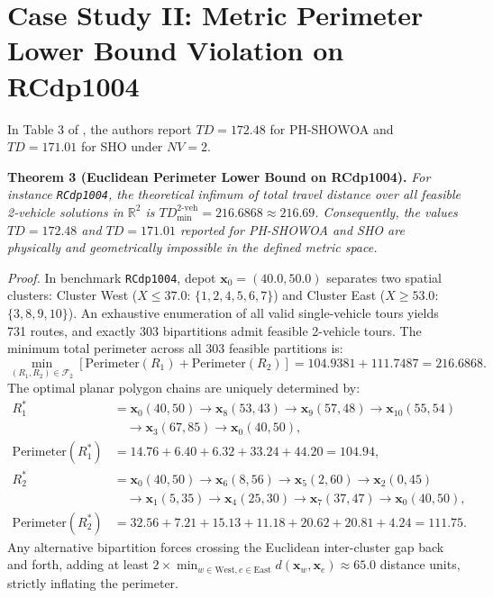 \documentclass[review]{elsarticle}
\begin{document}
\section{Case Study II: Metric Perimeter Lower Bound Violation on RCdp1004}
\label{sec:rcdp1004}
In Table 3 of \cite{nguyen2026phshowoa}, the authors report $TD = 172.48$ for PH-SHOWOA and $TD = 171.01$ for SHO under $NV = 2$.

\vspace{0.25cm}
\noindent\textbf{Theorem 3 (Euclidean Perimeter Lower Bound on RCdp1004).}
\textit{For instance \texttt{RCdp1004}, the theoretical infimum of total travel distance over all feasible 2-vehicle solutions in $\mathbb{R}^2$ is $TD_{\min}^{2\text{-veh}} = 216.6868 \approx 216.69$. Consequently, the values $TD = 172.48$ and $TD = 171.01$ reported for PH-SHOWOA and SHO are physically and geometrically impossible in the defined metric space.}

\vspace{0.15cm}
\noindent\textit{Proof.}
In benchmark \texttt{RCdp1004}, depot $\mathbf{x}_0 = (40.0, 50.0)$ separates two spatial clusters: Cluster West ($X \le 37.0$: $\{1, 2, 4, 5, 6, 7\}$) and Cluster East ($X \ge 53.0$: $\{3, 8, 9, 10\}$). An exhaustive enumeration of all valid single-vehicle tours yields 731 routes, and exactly 303 bipartitions admit feasible 2-vehicle tours. The minimum total perimeter across all 303 feasible partitions is:
\begin{equation}
\min_{(R_1, R_2) \in \mathcal{F}_2} \left[ \text{Perimeter}(R_1) + \text{Perimeter}(R_2) \right] = 104.9381 + 111.7487 = 216.6868.
\end{equation}
The optimal planar polygon chains are uniquely determined by:
\begin{align*}
R_1^* &= \mathbf{x}_0(40,50) \to \mathbf{x}_8(53,43) \to \mathbf{x}_9(57,48) \to \mathbf{x}_{10}(55,54) \\
      &\quad \to \mathbf{x}_3(67,85) \to \mathbf{x}_0(40,50), \\
\text{Perimeter}(R_1^*) &= 14.76 + 6.40 + 6.32 + 33.24 + 44.20 = 104.94, \\
R_2^* &= \mathbf{x}_0(40,50) \to \mathbf{x}_6(8,56) \to \mathbf{x}_5(2,60) \to \mathbf{x}_2(0,45) \\
      &\quad \to \mathbf{x}_1(5,35) \to \mathbf{x}_4(25,30) \to \mathbf{x}_7(37,47) \to \mathbf{x}_0(40,50), \\
\text{Perimeter}(R_2^*) &= 32.56 + 7.21 + 15.13 + 11.18 + 20.62 + 20.81 + 4.24 = 111.75.
\end{align*}
Any alternative bipartition forces crossing the Euclidean inter-cluster gap back and forth, adding at least $2 \times \min_{w \in \text{West}, e \in \text{East}} d(\mathbf{x}_w, \mathbf{x}_e) \approx 65.0$ distance units, strictly inflating the perimeter. 
\end{document}
